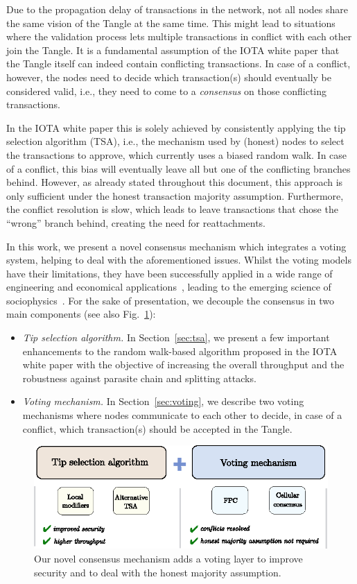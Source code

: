 \documentclass[../main.tex]{subfiles}
\begin{document}
Due to the propagation delay of transactions in the network, not all nodes share the same vision of the Tangle at the same time.
This might lead to situations where the validation process lets multiple transactions in conflict with each other join the Tangle.
It is a fundamental assumption of the IOTA white paper that the Tangle itself can indeed contain conflicting transactions.
In case of a conflict, however, the nodes need to decide which transaction(s) should eventually be considered valid, i.e., they need to come to a \emph{consensus} on those conflicting transactions.

In the IOTA white paper this is solely achieved by consistently applying the tip selection algorithm (TSA), i.e., the mechanism used by (honest) nodes to select the transactions to approve, which currently uses a biased random walk. In case of a conflict, this bias will eventually leave all but one of the conflicting branches behind. However, as already stated throughout this document, this approach is only sufficient under the honest transaction majority assumption. Furthermore, the conflict resolution is slow, which leads to leave transactions that chose the ``wrong'' branch behind, creating the need for reattachments.

In this work, we present a novel consensus mechanism which integrates a voting system, helping to deal with the aforementioned issues. Whilst the voting models have their limitations, they have been successfully applied in a wide range of engineering and economical applications~\cite{banisch2010, niu2015, przyby2011}, leading to the emerging science of sociophysics~\cite{castellano2009}. For the sake of presentation, we decouple the consensus in two main components (see also Fig.~\ref{fig:consensus-diagram}):
\begin{itemize}
    \item \textit{Tip selection algorithm.} In Section~\ref{sec:tsa}, we present a few important enhancements to the random walk-based algorithm proposed in the IOTA white paper with the objective of increasing the overall throughput and the robustness against parasite chain and splitting attacks.
    \item \textit{Voting mechanism.} In Section~\ref{sec:voting}, we describe two voting mechanisms where nodes communicate to each other to decide, in case of a conflict, which transaction(s) should be accepted in the Tangle.
\end{itemize}

\begin{figure}[h]
     \centering
     \includegraphics[scale=1.2]{images/consensus-diagram.eps}
     \caption{Our novel consensus mechanism adds a voting layer to improve security and to deal with the honest majority assumption.}
     \label{fig:consensus-diagram}
\end{figure}
\end{document}
